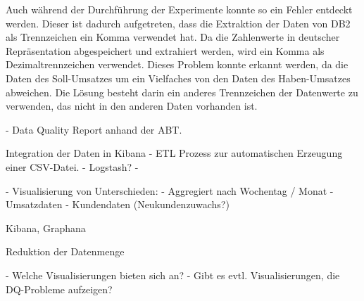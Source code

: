 Auch während der Durchführung der Experimente konnte so ein Fehler entdeckt werden. 
Dieser ist dadurch aufgetreten, dass die Extraktion der Daten von DB2 als Trennzeichen ein Komma verwendet hat. 
Da die Zahlenwerte in deutscher Repräsentation abgespeichert und extrahiert werden, wird ein Komma als Dezimaltrennzeichen verwendet. 
Dieses Problem konnte erkannt werden, da die Daten des Soll-Umsatzes um ein Vielfaches von den Daten des Haben-Umsatzes abweichen. 
Die Lösung besteht darin ein anderes Trennzeichen der Datenwerte zu verwenden, das nicht in den anderen Daten vorhanden ist. 








- Data Quality Report anhand der ABT.


Integration der Daten in Kibana
- ETL Prozess zur automatischen Erzeugung einer CSV-Datei.
- Logstash?
- 

- Visualisierung von Unterschieden:
- Aggregiert nach Wochentag / Monat
- Umsatzdaten
- Kundendaten (Neukundenzuwachs?)


Kibana, Graphana

Reduktion der Datenmenge



- Welche Visualisierungen bieten sich an?
- Gibt es evtl. Visualisierungen, die DQ-Probleme aufzeigen?
